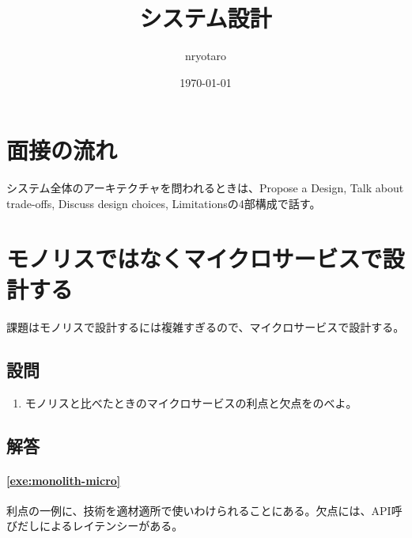 \documentclass{jlreq}
\begin{document}
\title{システム設計}
\author{nryotaro}
\date{\today}
\maketitle
\tableofcontents
\section{面接の流れ}
\begin{refsection}
  システム全体のアーキテクチャを問われるときは、Propose a Design, Talk about trade-offs, Discuss design choices, Limitationsの4部構成で話す\cite{lc-high}。
  \printjbibliography
\end{refsection}
\section{モノリスではなくマイクロサービスで設計する}
\begin{refsection}
  課題はモノリスで設計するには複雑すぎるので、マイクロサービスで設計する\cite{lc-aa}。
  \subsection{設問}
  \begin{enumerate}[label=問題\arabic*,labelsep=10pt,leftmargin=*]
  \item モノリスと比べたときのマイクロサービスの利点と欠点をのべよ。\label{exe:monolith-micro}
  \end{enumerate}
  \subsection{解答}
  \paragraph{\ref{exe:monolith-micro}}
  利点の一例に、技術を適材適所で使いわけられることにある。欠点には、API呼びだしによるレイテンシーがある\cite{lc-aa}。
  \printjbibliography
\end{refsection}
\end{document}
